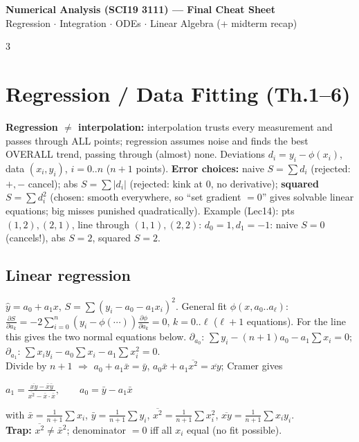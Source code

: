 \documentclass[9pt]{extarticle}
\newcommand{\hl}[1]{\textbf{\textcolor{BrickRed}{#1}}}
\newcommand{\sepline}{\vspace{1pt}{\color{RoyalBlue}\hrule}\vspace{3pt}}
\begin{document}
\footnotesize

\AddToShipoutPicture*{%
\AtTextUpperLeft{%
\raisebox{6pt}{\makebox[\textwidth][r]{\normalfont\scriptsize\textcolor{black!60}{Updated: 26 Sep 2026 00:44}}}%
}%
}
\begin{center}
\colorbox{ForestGreen!12}{\parbox{0.97\linewidth}{\centering
{\bfseries\large\color{ForestGreen} Numerical Analysis (SCI19 3111) --- Final Cheat Sheet}\\[1.5pt]
{\scriptsize\color{ForestGreen!70!black} Regression $\cdot$ Integration $\cdot$ ODEs $\cdot$ Linear Algebra (+ midterm recap)}}}
\end{center}
\sepline

\begin{multicols}{3}

\section{Regression / Data Fitting (Th.1--6)}
\begin{sloppypar}\raggedright
\textbf{Regression $\ne$ interpolation:} interpolation trusts every measurement and passes through ALL points; regression assumes noise and finds the best OVERALL trend, passing through (almost) none.
Deviations $d_i=y_i-\phi(x_i)$, data $(x_i,y_i)$, $i=0..n$ ($n{+}1$ points).
\textbf{Error choices:} naive $S=\sum d_i$ (rejected: $+,-$ cancel); abs $S=\sum|d_i|$ (rejected: kink at 0, no derivative); \hl{squared} $S=\sum d_i^2$ (chosen: smooth everywhere, so ``set gradient $=0$'' gives solvable linear equations; big misses punished quadratically).
Example (Lec14): pts $(1,2),(2,1)$, line through $(1,1),(2,2)$: $d_0=1,d_1=-1$: naive $S=0$ (cancels!), abs $S=2$, squared $S=2$.

\subsection{Linear regression}
$\hat y=a_0+a_1x$, $S=\sum(y_i-a_0-a_1x_i)^2$. General fit $\phi(x,a_0{..}a_\ell)$: $\tfrac{\partial S}{\partial a_k}=-2\sum_{i=0}^n(y_i-\phi(\cdots))\tfrac{\partial\phi}{\partial a_k}=0$, $k=0..\ell$ ($\ell{+}1$ equations). For the line this gives the two normal equations below.
$\partial_{a_0}$: $\sum y_i-(n{+}1)a_0-a_1\sum x_i=0$; $\partial_{a_1}$: $\sum x_iy_i-a_0\sum x_i-a_1\sum x_i^2=0$.\\
Divide by $n{+}1$ $\Rightarrow$ $a_0+a_1\bar x=\bar y$, $a_0\bar x+a_1\overline{x^2}=\overline{xy}$; Cramer gives
\begin{kbox}
\centering
$\displaystyle a_1=\frac{\overline{xy}-\bar x\bar y}{\overline{x^2}-\bar x\cdot\bar x},\qquad a_0=\bar y-a_1\bar x$
\end{kbox}
with $\bar x=\tfrac1{n+1}\sum x_i$, $\bar y=\tfrac1{n+1}\sum y_i$, $\overline{x^2}=\tfrac1{n+1}\sum x_i^2$, $\overline{xy}=\tfrac1{n+1}\sum x_iy_i$.\\
\hl{Trap:} $\overline{x^2}\ne\bar x^2$; denominator $=0$ iff all $x_i$ equal (no fit possible).


\end{sloppypar}
\end{multicols}
\end{document}
